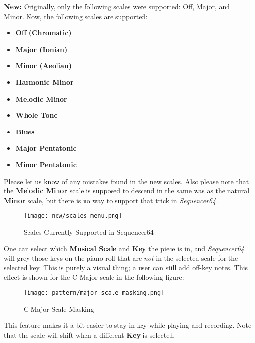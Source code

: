    \textbf{New:}
   Originally, only the following scales were supported: Off, Major, and Minor.
   Now, the following scales are supported:

   \begin{itemize}
      \item \textbf{Off (Chromatic)}
      \item \textbf{Major (Ionian)}
      \item \textbf{Minor (Aeolian)}
      \item \textbf{Harmonic Minor}
      \item \textbf{Melodic Minor}
      \item \textbf{Whole Tone}
      \item \textbf{Blues}
      \item \textbf{Major Pentatonic}
      \item \textbf{Minor Pentatonic}
   \end{itemize}

   Please let us know of any mistakes found in the new scales.
   Also please note that the \textbf{Melodic Minor} scale is supposed to
   descend in the same was as the natural \textbf{Minor} scale, but
   there is no way to support that trick in
   \textsl{Sequencer64}.

\begin{figure}[H]
   \centering 
   \texttt{[image: new/scales-menu.png]}
   \caption{Scales Currently Supported in Sequencer64}
   \label{fig:pattern_editor_available_scales}
\end{figure}

   One can select which \textbf{Musical Scale} and
   \textbf{Key} the piece is in,
   and \textsl{Sequencer64} will grey those keys on the piano-roll that
   are \textsl{not} in the selected scale for the selected key.
   This is purely a visual thing; a user can still add off-key notes.
   This effect is shown for the C Major scale in the following figure:

\begin{figure}[H]
   \centering 
   \texttt{[image: pattern/major-scale-masking.png]}
   \caption{C Major Scale Masking}
   \label{fig:pattern_editor_major_scale_masking}
\end{figure}

   This feature makes it a bit easier to stay in key while playing and
   recording.  Note that the scale will shift when a different
   \textbf{Key} is selected.

